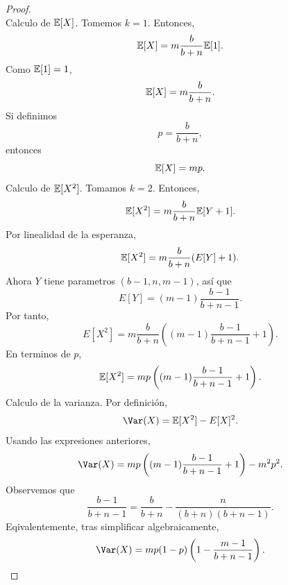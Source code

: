 \documentclass[12pt,a4paper]{article}
\newcommand{\paren}[1]{\left( #1 \right)}
\begin{document}
\begin{proof}
\begin{equation*}
        \end{equation*}
        Calculo de $\mathbb{E}[X]$. Tomemos $k=1$. Entonces,
        \begin{equation*}
            \mathbb{E}[X]=m\frac{b}{b+n}\mathbb{E}[1].
        \end{equation*}
        Como $\mathbb{E}[1]=1$,
        \begin{equation*}
            \mathbb{E}[X]=m\frac{b}{b+n}.
        \end{equation*}
        Si definimos
        \begin{equation*}
            p=\frac{b}{b+n},
        \end{equation*}
        entonces
        \begin{equation*}
            \mathbb{E}[X]=mp.
        \end{equation*}
        Calculo de $\mathbb{E}[X^{2}]$. Tomamos $k=2$. Entonces,
        \begin{equation*}
            \mathbb{E}[X^{2}]=m\frac{b}{b+n}\mathbb{E}[Y+1].
        \end{equation*}
        Por linealidad de la esperanza,
        \begin{equation*}
            \mathbb{E}[X^{2}]=m\frac{b}{b+n}(E[Y]+1).
        \end{equation*}
        Ahora $Y$ tiene parametros $(b-1,n,m-1)$, así que
        \begin{equation*}
            E[Y]=(m-1)\frac{b-1}{b+n-1}.
        \end{equation*}
        Por tanto,
        \begin{equation*}
            E[X^{2}]=m\frac{b}{b+n}\paren{(m-1)\frac{b-1}{b+n-1}+1}.
        \end{equation*}
        En terminos de $p$,
        \begin{equation*}
            \E[X^{2}]=mp\paren{(m-1)\frac{b-1}{b+n-1}+1}.
        \end{equation*}
        Calculo de la varianza. Por definición,
        \begin{equation*}
            \Var(X)=\E[X^{2}]-E[X]^{2}.
        \end{equation*}
        Usando las expresiones anteriores,
        \begin{equation*}
            \Var(X)=mp\paren{(m-1)\frac{b-1}{b+n-1}+1}-m^{2}p^{2}.
        \end{equation*}
        Observemos que
        \begin{equation*}
            \frac{b-1}{b+n-1}=\frac{b}{b+n}-\frac{n}{(b+n)(b+n-1)}.
        \end{equation*}
        Eqivalentemente, tras simplificar algebraicamente,
        \begin{equation*}
            \Var(X)=mp(1-p)\paren{1-\frac{m-1}{b+n-1}}.
        \end{equation*}
    \end{proof}
\end{document}
